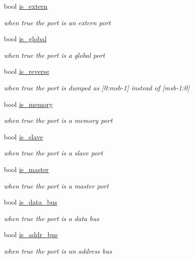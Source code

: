 \begin{DoxyCompactItemize}
bool \hyperlink{structport__o_ae21eed41bc107bc6ffffd3eca1666127}{is\+\_\+extern}
\begin{DoxyCompactList}\small\item\em when true the port is an extern port \end{DoxyCompactList}\item 
bool \hyperlink{structport__o_a3a9f7bf7636a11fa50f05316a5f6891b}{is\+\_\+global}
\begin{DoxyCompactList}\small\item\em when true the port is a global port \end{DoxyCompactList}\item 
bool \hyperlink{structport__o_a2eb0cc26ca21e9b263a105489ff21f48}{is\+\_\+reverse}
\begin{DoxyCompactList}\small\item\em when true the port is dumped as \mbox{[}0\+:msb-\/1\mbox{]} instead of \mbox{[}msb-\/1\+:0\mbox{]} \end{DoxyCompactList}\item 
bool \hyperlink{structport__o_a77eda83f4541321f72ef13489c10b113}{is\+\_\+memory}
\begin{DoxyCompactList}\small\item\em when true the port is a memory port \end{DoxyCompactList}\item 
bool \hyperlink{structport__o_a1c5059759ad09f147afde1984c86a1b8}{is\+\_\+slave}
\begin{DoxyCompactList}\small\item\em when true the port is a slave port \end{DoxyCompactList}\item 
bool \hyperlink{structport__o_a9f3c1f926a4d5de280378354dca14e5e}{is\+\_\+master}
\begin{DoxyCompactList}\small\item\em when true the port is a master port \end{DoxyCompactList}\item 
bool \hyperlink{structport__o_adfab03b8f047b4deecbc8bf70b4ea2da}{is\+\_\+data\+\_\+bus}
\begin{DoxyCompactList}\small\item\em when true the port is a data bus \end{DoxyCompactList}\item 
bool \hyperlink{structport__o_a56013273038729a16012452840a8d1b7}{is\+\_\+addr\+\_\+bus}
\begin{DoxyCompactList}\small\item\em when true the port is an address bus \end{DoxyCompactList}\item 

\end{DoxyCompactItemize}
